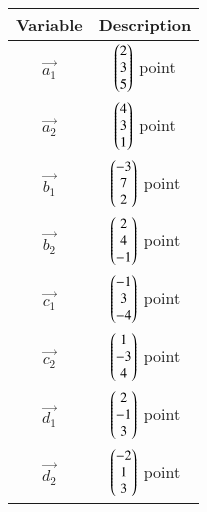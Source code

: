 \begin{tabular}[12pt]{ |c| c|}
    \hline
    \textbf{Variable} & \textbf{Description}\\ 
    \hline
	$\vec{a_1}$ & $\begin{pmatrix}2\\3\\5\end{pmatrix}$ point\\
    \hline
	$\vec{a_2}$ & $\begin{pmatrix}4\\3\\1\end{pmatrix}$ point\\
    \hline
	$\vec{b_1}$ & $\begin{pmatrix}-3\\7\\2\end{pmatrix}$ point\\
	\hline
	$\vec{b_2}$ & $\begin{pmatrix}2\\4\\-1\end{pmatrix}$ point\\
	\hline
	$\vec{c_1}$ & $\begin{pmatrix}-1\\3\\-4\end{pmatrix}$ point\\
    \hline
	$\vec{c_2}$ & $\begin{pmatrix}1\\-3\\4\end{pmatrix}$ point\\
    \hline
	$\vec{d_1}$ & $\begin{pmatrix}2\\-1\\3\end{pmatrix}$ point\\
	\hline
	$\vec{d_2}$ & $\begin{pmatrix}-2\\1\\3\end{pmatrix}$ point\\
	\hline

    \end{tabular}
